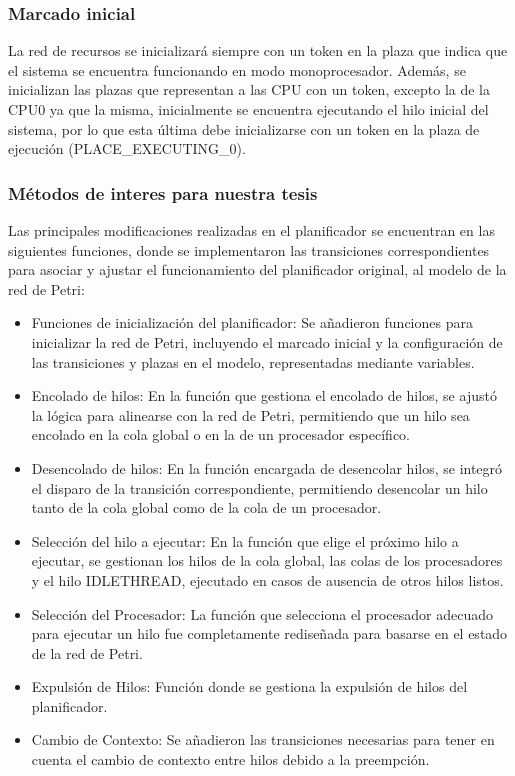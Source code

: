 \subsubsection{Marcado inicial}
La red de recursos se inicializará siempre con un token en la plaza que indica que el sistema se encuentra funcionando en modo monoprocesador. Además, se inicializan las plazas que representan a las CPU con un token, excepto la de la CPU0 ya que la misma, inicialmente se encuentra ejecutando el hilo inicial del sistema, por lo que esta última debe inicializarse con un token en la plaza de ejecución (PLACE\_EXECUTING\_0).



\subsubsection{Métodos de interes para nuestra tesis}

Las principales modificaciones realizadas en el planificador se encuentran en las siguientes funciones, donde se implementaron las transiciones correspondientes para asociar y ajustar el funcionamiento del planificador original, al modelo de la red de Petri:

\begin{itemize}
    \item Funciones de inicialización del planificador: Se añadieron funciones para inicializar la red de Petri, incluyendo el marcado inicial y la configuración de las transiciones y plazas en el modelo, representadas mediante variables.
    \item Encolado de hilos: En la función que gestiona el encolado de hilos, se ajustó la lógica para alinearse con la red de Petri, permitiendo que un hilo sea encolado en la cola global o en la de un procesador específico.
    \item Desencolado de hilos: En la función encargada de desencolar hilos, se integró el disparo de la transición correspondiente, permitiendo desencolar un hilo tanto de la cola global como de la cola de un procesador.
    \item Selección del hilo a ejecutar: En la función que elige el próximo hilo a ejecutar, se gestionan los hilos de la cola global, las colas de los procesadores y el hilo IDLETHREAD, ejecutado en casos de ausencia de otros hilos listos.
    \item Selección del Procesador: La función que selecciona el procesador adecuado para ejecutar un hilo fue completamente rediseñada para basarse en el estado de la red de Petri.
    \item Expulsión de Hilos: Función donde se gestiona la expulsión de hilos del planificador.
    \item Cambio de Contexto: Se añadieron las transiciones necesarias para tener en cuenta el cambio de contexto entre hilos debido a la preempción.
\end{itemize}

